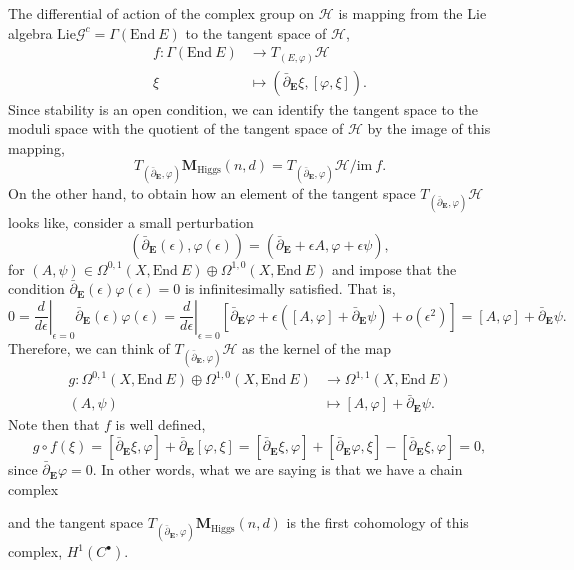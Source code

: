 \documentclass[12pt,a4paper]{book}
\theoremstyle{definition} \newtheorem{defn}[thm]{Definition}
\theoremstyle{definition} \newtheorem{ejemplo}[thm]{Example}
\theoremstyle{remark} \newtheorem{rem}[thm]{Remark}
\def\HH{\mathscr{H}}
\def\GG{\mathscr{G}}
\def\im{\mathrm{im}\ }
\def\Lie{\mathrm{Lie}}
\def\End{\mathrm{End}}
\def\Hig{\mathbf{M}_{\mathrm{Higgs}}}
\def\delbar{\bar{\partial}}
\newcommand{\ve}[1]{\mathbf{#1}}
\begin{document}
	    The differential of action of the complex group on $\HH$ is mapping from the Lie algebra $\Lie \GG^c= \Gamma(\End\ E)$ to the tangent space of $\HH$,
	    \begin{align*}
	      f:\Gamma(\End\ E)&\longrightarrow T_{(E,\varphi)}\HH\\ 
	      \xi &\longmapsto (\delbar_{\ve{E}} \xi, [\varphi,\xi]). 
	      \end{align*}
	      Since stability is an open condition, we can identify the tangent space to the moduli space with the quotient of the tangent space of $\HH$ by the image of this mapping, $$T_{(\delbar_{\ve{E}},\varphi)}\Hig(n,d)=T_{(\delbar_{\ve{E}},\varphi)}\HH/\im f.$$ On the other hand, to obtain how an element of the tangent space $T_{(\delbar_{\ve{E}},\varphi)}\HH$ looks like, consider a small perturbation $$(\delbar_{\ve{E}}(\epsilon), \varphi(\epsilon))=(\delbar_{\ve{E}}+\epsilon A, \varphi + \epsilon \psi),$$ for $(A,\psi) \in \Omega^{0,1}(X,\End \ E) \oplus \Omega^{1,0}(X, \End \ E)$ and impose that the condition $\delbar_{\ve{E}}(\epsilon)\varphi(\epsilon)=0$ is infinitesimally satisfied. That is,
	    \begin{equation*}
	      0=\left.\frac{d}{d\epsilon} \right|_{\epsilon=0} \delbar_{\ve{E}}(\epsilon)\varphi(\epsilon)=\left.\frac{d}{d\epsilon} \right|_{\epsilon=0}\left[ \delbar_{\ve{E}} \varphi + \epsilon\left( [A,\varphi]+\delbar_{\ve{E}}\psi \right)+ o(\epsilon^2) \right] = [A,\varphi]+\delbar_{\ve{E}}\psi.
	    \end{equation*}
	    Therefore, we can think of $T_{(\delbar_{\ve{E}},\varphi)}\HH$ as the kernel of the map
	    \begin{align*}
	      g :\Omega^{0,1}(X,\End \ E) \oplus \Omega^{1,0}(X, \End \ E)&\longrightarrow \Omega^{1,1}(X, \End\ E)\\ 
	      (A,\psi) &\longmapsto [A,\varphi]+\delbar_{\ve{E}}\psi. 
	      \end{align*}
	      Note then that $f$ is well defined,
	      \begin{equation*}
		g\circ f(\xi)=[\delbar_{\ve{E}}\xi,\varphi]+\delbar_{\ve{E}}[\varphi,\xi]=[\delbar_{\ve{E}}\xi,\varphi]+[\delbar_{\ve{E}}\varphi,\xi]-[\delbar_{\ve{E}}\xi,\varphi]=0,
	      \end{equation*}
	      since $\delbar_{\ve{E}}\varphi=0$. In other words, what we are saying is that we have a chain complex
	      \begin{center}
	      \end{center}
	      and the tangent space $T_{(\delbar_{\ve{E}},\varphi)}\Hig(n,d)$ is the first cohomology of this complex, $H^1(C^\bullet)$.
\end{document}
